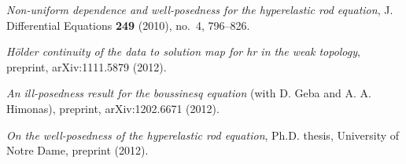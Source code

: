 \documentclass[12pt]{article}
\begin{document}
\nocite{Geba:2012}
\nocite{Karapetyan:2010fk}
\nocite{Karapetyan:2011}
\nocite{Karapetyan:2012}
\large
\providecommand{\bysame}{\leavevmode\hbox to3em{\hrulefill}\thinspace}
\providecommand{\MR}{\relax\ifhmode\unskip\space\fi MR }
\providecommand{\MRhref}[2]{%
  \href{http://www.ams.org/mathscinet-getitem?mr=#1}{#2}
}
\providecommand{\href}[2]{#2}
\begin{thebibliography}{1}

\href{http://davidkarapetyan.com/pdfs/hr-nud-2010.pdf}{\emph{Non-uniform dependence and well-posedness for the
hyperelastic rod equation}}, J. Differential Equations \textbf{249} (2010),
  no.~4, 796--826.

\href{http://arxiv.org/abs/1111.5879}{\emph{H{\"o}lder continuity of the data to solution map for hr in the
weak topology}}, preprint, arXiv:1111.5879 (2012).

\href{http://arxiv.org/abs/1202.6671}{\emph{An
ill-posedness result for the boussinesq equation}} (with D. Geba and A. A. Himonas), preprint, arXiv:1202.6671
  (2012).

\href{http://davidkarapetyan.com/pdfs/thesis.pdf}{\emph{On the well-posedness of the hyperelastic rod equation}}, Ph.D.
thesis, University of Notre Dame, preprint (2012).

\end{thebibliography}
        
        
\end{document}
